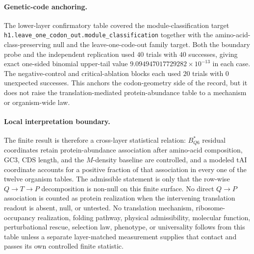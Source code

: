 \paragraph{Genetic-code anchoring.}
The lower-layer confirmatory table covered the module-classification target \texttt{h1.leave\_one\_codon\_out.module\_classification} together with the amino-acid-class-preserving null and the leave-one-code-out family target. Both the boundary probe and the independent replication used $40$ trials with $40$ successes, giving exact one-sided binomial upper-tail value $9.094947017729282\times 10^{-13}$ in each case. The negative-control and critical-ablation blocks each used $20$ trials with $0$ unexpected successes. This anchors the codon-geometry side of the record, but it does not raise the translation-mediated protein-abundance table to a mechanism or organism-wide law.

\paragraph{Local interpretation boundary.}
The finite result is therefore a cross-layer statistical relation: $B^{*}_{Q6}$ residual coordinates retain protein-abundance association after amino-acid composition, GC3, CDS length, and the $M$-density baseline are controlled, and a modeled tAI coordinate accounts for a positive fraction of that association in every one of the twelve organism tables. The admissible statement is only that the row-wise $Q\to T\to P$ decomposition is non-null on this finite surface. No direct $Q\to P$ association is counted as protein realization when the intervening translation readout is absent, null, or untested. No translation mechanism, ribosome-occupancy realization, folding pathway, physical admissibility, molecular function, perturbational rescue, selection law, phenotype, or universality follows from this table unless a separate layer-matched measurement supplies that contact and passes its own controlled finite statistic.

